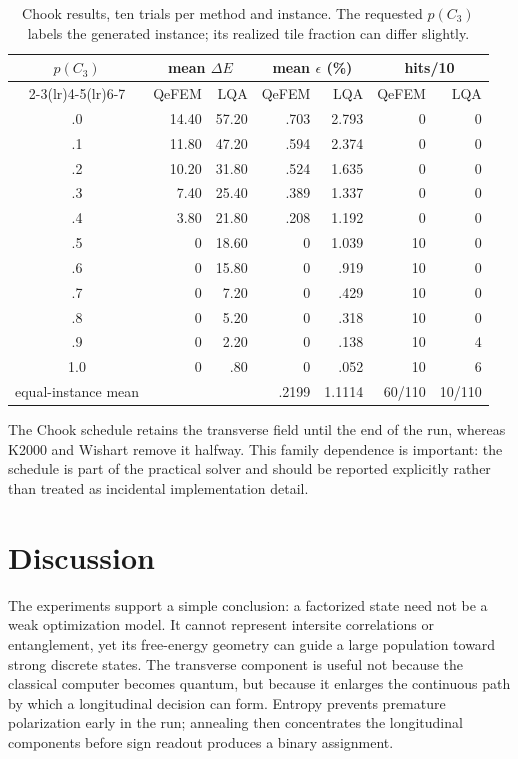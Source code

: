 \documentclass[
  aps,
  prx,
  reprint,
  amsmath,
  amssymb,
  groupedaddress,
  nofootinbib,
  floatfix,
  longbibliography
]{revtex4-2}
\newcommand{\qefem}{QeFEM}
\newcommand{\lqa}{\textsc{LQA}}
\begin{document}
\begin{table}[t]
\caption{Chook results, ten trials per method and instance.  The requested
$p(C_3)$ labels the generated instance; its realized tile fraction can differ
slightly.}
\label{tab:chook-results}
\centering
\small
\setlength{\tabcolsep}{5pt}
\begin{tabular}{crrrrrr}
\toprule
$p(C_3)$ & \multicolumn{2}{c}{mean $\Delta E$} & \multicolumn{2}{c}{mean $\epsilon$ (\%)} & \multicolumn{2}{c}{hits/10} \\
\cmidrule(lr){2-3}\cmidrule(lr){4-5}\cmidrule(lr){6-7}
& \qefem{} & \lqa{} & \qefem{} & \lqa{} & \qefem{} & \lqa{} \\
\midrule
.0&14.40&57.20&.703&2.793&0&0\\
.1&11.80&47.20&.594&2.374&0&0\\
.2&10.20&31.80&.524&1.635&0&0\\
.3&7.40&25.40&.389&1.337&0&0\\
.4&3.80&21.80&.208&1.192&0&0\\
.5&0&18.60&0&1.039&10&0\\
.6&0&15.80&0&.919&10&0\\
.7&0&7.20&0&.429&10&0\\
.8&0&5.20&0&.318&10&0\\
.9&0&2.20&0&.138&10&4\\
1.0&0&.80&0&.052&10&6\\
\midrule
equal-instance mean&&&.2199&1.1114&60/110&10/110\\
\bottomrule
\end{tabular}
\end{table}

The Chook schedule retains the transverse field until the end of the run,
whereas K2000 and Wishart remove it halfway.  This family dependence is
important: the schedule is part of the practical solver and should be reported
explicitly rather than treated as incidental implementation detail.

\clearpage
\section{Discussion}
\label{sec:discussion}

The experiments support a simple conclusion: a factorized state need not be a
weak optimization model.  It cannot represent intersite correlations or
entanglement, yet its free-energy geometry can guide a large population toward
strong discrete states.  The transverse component is useful not because the
classical computer becomes quantum, but because it enlarges the continuous
path by which a longitudinal decision can form.  Entropy prevents premature
polarization early in the run; annealing then concentrates the longitudinal
components before sign readout produces a binary assignment.
\end{document}

